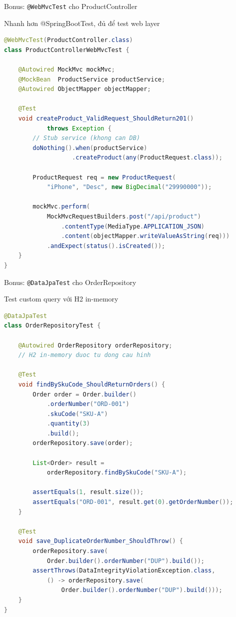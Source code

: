 \documentclass[aspectratio=169,10pt]{beamer}
\begin{document}
\begin{frame}[fragile]{Bonus: \texttt{@WebMvcTest} cho ProductController}
  \begin{block}{Nhanh hơn @SpringBootTest, đủ để test web layer}
\begin{lstlisting}[language=Java]
@WebMvcTest(ProductController.class)
class ProductControllerWebMvcTest {

    @Autowired MockMvc mockMvc;
    @MockBean  ProductService productService;
    @Autowired ObjectMapper objectMapper;

    @Test
    void createProduct_ValidRequest_ShouldReturn201()
            throws Exception {
        // Stub service (khong can DB)
        doNothing().when(productService)
                   .createProduct(any(ProductRequest.class));

        ProductRequest req = new ProductRequest(
            "iPhone", "Desc", new BigDecimal("29990000"));

        mockMvc.perform(
            MockMvcRequestBuilders.post("/api/product")
                .contentType(MediaType.APPLICATION_JSON)
                .content(objectMapper.writeValueAsString(req)))
            .andExpect(status().isCreated());
    }
}
\end{lstlisting}
  \end{block}
\end{frame}

\begin{frame}[fragile]{Bonus: \texttt{@DataJpaTest} cho OrderRepository}
  \begin{block}{Test custom query với H2 in-memory}
\begin{lstlisting}[language=Java]
@DataJpaTest
class OrderRepositoryTest {

    @Autowired OrderRepository orderRepository;
    // H2 in-memory duoc tu dong cau hinh

    @Test
    void findBySkuCode_ShouldReturnOrders() {
        Order order = Order.builder()
            .orderNumber("ORD-001")
            .skuCode("SKU-A")
            .quantity(3)
            .build();
        orderRepository.save(order);

        List<Order> result =
            orderRepository.findBySkuCode("SKU-A");

        assertEquals(1, result.size());
        assertEquals("ORD-001", result.get(0).getOrderNumber());
    }

    @Test
    void save_DuplicateOrderNumber_ShouldThrow() {
        orderRepository.save(
            Order.builder().orderNumber("DUP").build());
        assertThrows(DataIntegrityViolationException.class,
            () -> orderRepository.save(
                Order.builder().orderNumber("DUP").build()));
    }
}
\end{lstlisting}
  \end{block}
\end{frame}
\end{document}
